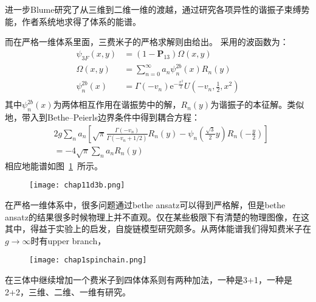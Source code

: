 进一步Blume研究了从三维到二维一维的渡越，通过研究各项异性的谐振子束缚势能，作者系统地求得了体系的能谱。

而在严格一维体系里面，三费米子的严格求解则由\cite{Rittenhouse2010green,d2014three,loft2015variational,andersen2016interpolatory,bellotti2017comparing}给出。
采用的波函数为：
\begin{equation}
\begin{split}
\psi_{3 F}(x, y)&=\left(1-\boldsymbol{P}_{13}\right) \Omega(x, y)\\
\Omega(x, y)&=\sum_{n=0}^{\infty} a_{n} \psi_{n}^{2b}(x) R_{n}(y)\\
\psi_{n}^{2b}(x)&=\Gamma\left(-v_{n}\right) \mathrm{e}^{-\frac{x^{2}}{2}} U\left(-v_{n}, \frac{1}{2}, x^{2}\right)\\
\end{split}
\end{equation}
其中$\psi_{n}^{2b}(x)$为两体相互作用在谐振势中的解，$R_{n}(y)$为谐振子的本征解。类似地，带入到Bethe–Peierls边界条件中得到耦合方程：
\begin{equation}
\begin{aligned}
&2 g \sum_{n} a_{n}\left[\sqrt{\pi} \frac{\Gamma\left(-v_{n}\right)}{\Gamma\left(-v_{n}+1 / 2\right)} R_{n}(y)-\psi_{n}\left(\frac{\sqrt{3}}{2} y\right) R_{n}\left(-\frac{y}{2}\right)\right] \\
&=-4 \sqrt{\pi} \sum_{n} a_{n} R_{n}(y)
\end{aligned}
\end{equation}
相应地能谱如图~\ref{1d3b}~所示。
\begin{figure}[!htbp]
    \centering
    \texttt{[image: chap11d3b.png]}
    \label{1d3b}
\end{figure}


在严格一维体系中，很多问题通过bethe ansatz可以得到严格解，但是bethe ansatz的结果很多时候物理上并不直观。仅在某些极限下有清楚的物理图像，在这其中，得益于实验上的启发，自旋链模型研究颇多。从两体能谱我们得知费米子在$g\to\infty$时有upper branch，
\begin{figure}[!htbp]
    \centering
    \texttt{[image: chap1spinchain.png]}
    \label{spinchain}
\end{figure}


在三体中继续增加一个费米子到四体体系则有两种加法，一种是3+1，一种是2+2，三维、二维、一维有研究。




